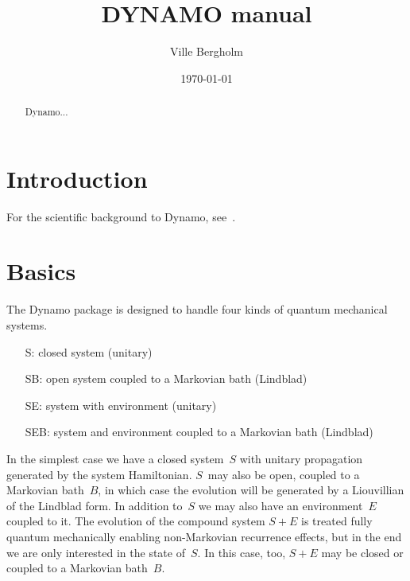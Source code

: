 \documentclass[aps, pra, a4paper, longbibliography]{revtex4}
\begin{document}
\title{DYNAMO manual}
\date{\today}

\author{Ville Bergholm}


\begin{abstract}
Dynamo...
\end{abstract}
\maketitle



\tableofcontents


\section{Introduction}

For the scientific background to Dynamo, see~\cite{machnes_2011}.



\section{Basics}
The Dynamo package is designed to handle four kinds of quantum
mechanical systems.
\begin{itemize}
\item[S:] closed system (unitary)
\item[SB:] open system coupled to a Markovian bath (Lindblad)
\item[SE:] system with environment (unitary)
\item[SEB:] system and environment coupled to a Markovian bath (Lindblad)
\end{itemize}
In the simplest case we have a closed system~$S$ with unitary
propagation generated by the system Hamiltonian.
$S$~may also be open, coupled to a Markovian bath~$B$, in which
case the evolution will be generated by a Liouvillian of the Lindblad form.
In addition to~$S$ we may also have an environment~$E$ coupled to
it. The evolution of the compound system $S+E$ is treated
fully quantum mechanically enabling non-Markovian recurrence effects,
but in the end we are only interested in the state of~$S$. In this
case, too, $S+E$ may be closed or coupled to a Markovian bath~$B$.
\end{document}
